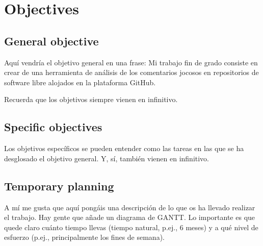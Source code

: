 

\cleardoublepage %
\chapter{Objectives} %
\label{chap:objectives} 

\section{General objective} %
\label{sec:general-objective}

Aquí vendría el objetivo general en una frase:
Mi trabajo fin de grado consiste en crear de una herramienta de análisis de los comentarios jocosos en repositorios de software libre alojados en la plataforma GitHub.

Recuerda que los objetivos siempre vienen en infinitivo.


\section{Specific objectives}
\label{sec:specific-objectives}

Los objetivos específicos se pueden entender como las tareas en las que se ha desglosado el objetivo general.
Y, sí, también vienen en infinitivo.


\section{Temporary planning}
\label{sec:temporary-planning}

A mí me gusta que aquí pongáis una descripción de lo que os ha llevado realizar el trabajo.
Hay gente que añade un diagrama de GANTT.
Lo importante es que quede claro cuánto tiempo llevas (tiempo natural, p.ej., 6 meses) y a qué nivel de esfuerzo (p.ej., principalmente los fines de semana).

